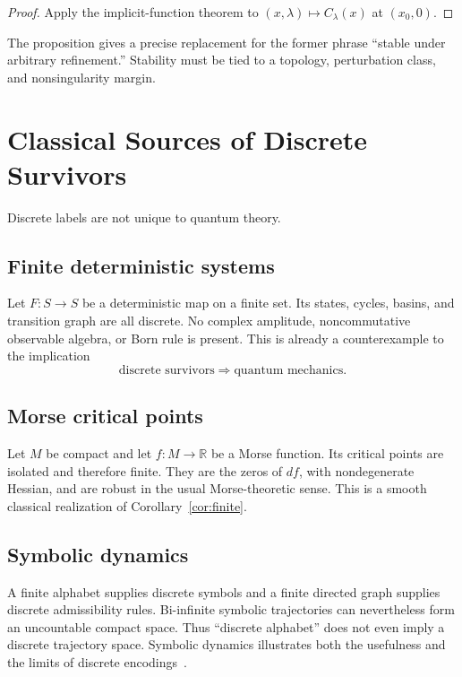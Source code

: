\documentclass[11pt]{article}
\begin{document}
\begin{proof}
Apply the implicit-function theorem to $(x,\lambda)\mapsto C_\lambda(x)$ at
$(x_0,0)$.
\end{proof}

The proposition gives a precise replacement for the former phrase ``stable
under arbitrary refinement.''  Stability must be tied to a topology,
perturbation class, and nonsingularity margin.

\section{Classical Sources of Discrete Survivors}

Discrete labels are not unique to quantum theory.

\subsection{Finite deterministic systems}

Let $F:S\to S$ be a deterministic map on a finite set.  Its states, cycles,
basins, and transition graph are all discrete.  No complex amplitude,
noncommutative observable algebra, or Born rule is present.  This is already a
counterexample to the implication
\[
 \text{discrete survivors}\Longrightarrow\text{quantum mechanics}.
\]

\subsection{Morse critical points}

Let $M$ be compact and let $f:M\to\mathbb R$ be a Morse function.  Its
critical points are isolated and therefore finite.  They are the zeros of
$df$, with nondegenerate Hessian, and are robust in the usual Morse-theoretic
sense.  This is a smooth classical realization of
Corollary~\ref{cor:finite}.

\subsection{Symbolic dynamics}

A finite alphabet supplies discrete symbols and a finite directed graph
supplies discrete admissibility rules.  Bi-infinite symbolic trajectories can
nevertheless form an uncountable compact space.  Thus ``discrete alphabet''
does not even imply a discrete trajectory space.  Symbolic dynamics illustrates
both the usefulness and the limits of discrete encodings~\cite{LindMarcus}.
\end{document}
